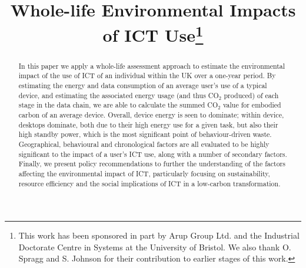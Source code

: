 \documentclass[conference]{IEEEtran}
\begin{document}

\title{Whole-life Environmental Impacts of ICT Use\thanks{This work has been sponsored in part by Arup Group Ltd. and the Industrial Doctorate Centre in Systems at the University of Bristol. We also thank O. Spragg and S. Johnson for their contribution to earlier stages of this work.}}


\author{
}





\maketitle


\begin{abstract}
In this paper we apply a whole-life assessment approach to estimate the
environmental impact of the use of ICT of an individual within the UK
over a one-year period. By estimating the energy and data consumption
of an average user's use of a typical device, and estimating
the associated energy usage (and thus CO$_2$ produced) of each stage
in the data chain, we are able to calculate the summed CO$_2$ value
for embodied carbon of an average device. 
Overall, device energy is seen to dominate; within device, desktops
dominate, both due to their high energy use for a given task, but also
their high standby power, which is the most significant point of
behaviour-driven waste. Geographical, behavioural and chronological
factors are all evaluated to be highly significant to the impact of a
user's ICT use, along with a number of secondary factors. Finally, we
present policy recommendations to further the understanding of the
factors affecting the environmental impact of ICT, particularly
focusing on sustainability, resource efficiency and the social
implications of ICT in a low-carbon transformation.
\end{abstract}
\end{document}
